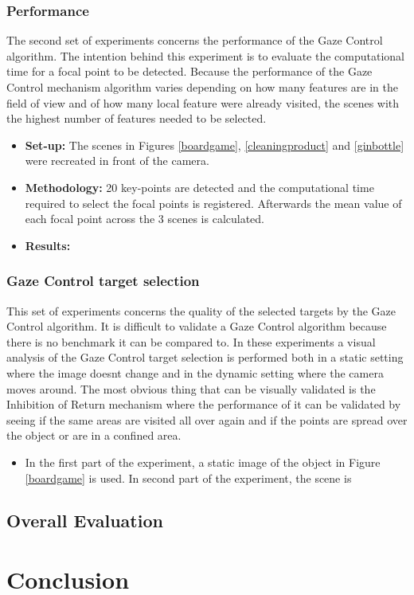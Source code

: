 \documentclass{l4proj}
\begin{document}
\subsection{Performance}

The second set of experiments concerns the performance of the Gaze Control algorithm. The intention behind this experiment is to evaluate the computational time for a focal point to be detected. Because the performance of the Gaze Control mechanism algorithm varies depending on how many features are in the field of view and of how many local feature were already visited, the scenes with the highest number of features needed to be selected.
\begin{itemize}
    \item \textbf{Set-up:} The scenes in Figures \ref{boardgame}, \ref{cleaningproduct} and \ref{ginbottle} were recreated in front of the camera. 
    \item \textbf{Methodology:} 20 key-points are detected and the computational time required to select the focal points is registered. Afterwards the mean value of each focal point across the 3 scenes is calculated. 
    \item \textbf{Results:}
\end{itemize}





\subsection{Gaze Control target selection}

This set of experiments concerns the quality of the selected targets by the Gaze Control algorithm. It is difficult to validate a Gaze Control algorithm because there is no benchmark it can be compared to. In these experiments a visual analysis of the Gaze Control target selection is performed both in a static setting where the image doesnt change and in the dynamic setting where the camera moves around. The most obvious thing that can be visually validated is the Inhibition of Return mechanism where the performance of it can be validated by seeing if the same areas are visited all over again and if the points are spread over the object or are in a confined area.  

\begin{itemize}
    \item In the first part of the experiment, a static image of the object in Figure \ref{boardgame} is used. In second part of the experiment, the scene is 
\end{itemize}






\section{Overall Evaluation}


\chapter{Conclusion}












\end{document}
